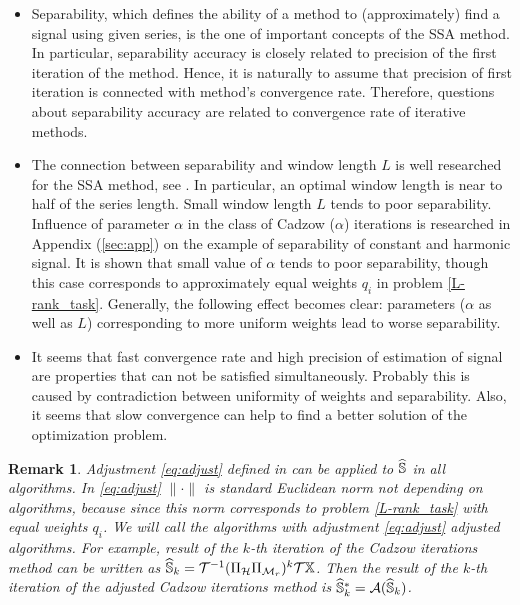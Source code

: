 \documentclass[sii]{ipart}
\newtheorem{remark}{Remark}
\begin{document}
\begin{itemize}
		\item
		Separability, which defines the ability of a method to (approximately) find a signal using given series, is the one of important concepts of the SSA method. In particular, separability accuracy is closely related to precision of the first iteration of the method. Hence, it is naturally to assume that precision of first iteration is connected with method's convergence rate. Therefore, questions about separability accuracy are related to convergence rate of iterative methods.
		\item
		The connection between separability and window length $L$ is well researched for the SSA method, see \cite{Golyandina2010}. In particular, an optimal window length is near to half of the series length. Small window length $L$ tends to poor separability. Influence of parameter $\alpha$ in the class of Cadzow ($\alpha$) iterations is researched in Appendix (\ref{sec:app}) on the example of separability of constant and harmonic signal. It is shown that small value of $\alpha$ tends to poor separability, though this case corresponds to approximately equal weights $q_i$ in problem \eqref{L-rank_task}. Generally, the following effect becomes clear: parameters ($\alpha$ as well as $L$) corresponding to more uniform weights lead to worse separability.
		\item
		It seems that fast convergence rate and high precision of estimation of signal are properties that can not be satisfied simultaneously. Probably this is caused by contradiction between uniformity of weights and separability. Also, it seems that slow convergence can help to find a better solution of the optimization problem.
	\end{itemize}
	
	\begin{remark}
		\label{rem:adjust}
		Adjustment \eqref{eq:adjust} defined in can be applied to $\widehat{\mathbb{S}}$ in all algorithms. In \eqref{eq:adjust} $\|\cdot\|$ is standard Euclidean norm not depending on algorithms, because since this norm corresponds to problem \eqref{L-rank_task} with equal weights $q_i$. We will call the algorithms with adjustment \eqref{eq:adjust} adjusted algorithms. For example, result of the $k$-th iteration of the Cadzow iterations method can be written as $\widehat{\mathbb{S}}_k = \mathcal{T}^{-1}(\Pi_{\mathcal{H}} \Pi_{\mathcal{M}_r})^k \mathcal{T} \mathbb{X}$. Then the result of the $k$-th iteration of the adjusted Cadzow iterations method is $\widehat{\mathbb{S}}_k^*=\mathcal{A}(\widehat{\mathbb{S}}_k)$.
	\end{remark}
\end{document}
